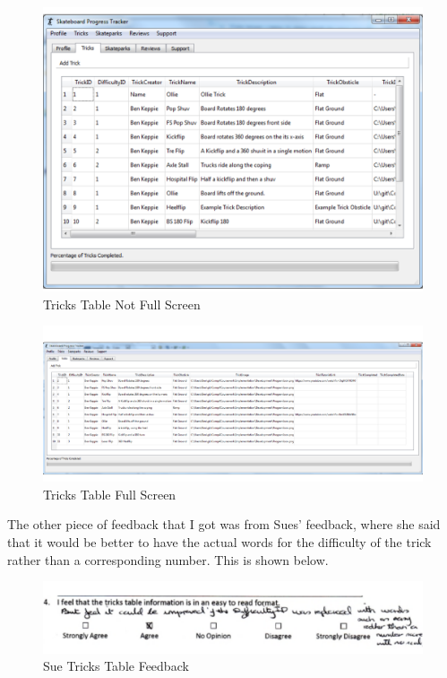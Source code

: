 \begin{figure}[H]
    \includegraphics[width=\textwidth]{./Evaluation/images/TricksTableNFS.pdf}
    \caption{Tricks Table Not Full Screen} \label{fig:TricksTableNFS}
\end{figure}

\begin{figure}[H]
    \includegraphics[width=\textwidth]{./Evaluation/images/TricksTableFS.pdf}
    \caption{Tricks Table Full Screen} \label{fig:TricksTableFS}
\end{figure} 

The other piece of feedback that I got was from Sues' feedback, where she said that it would be better to have the actual words for the difficulty of the trick rather than a corresponding number. This is shown below.

\begin{figure}[H]
    \includegraphics[width=\textwidth]{./Evaluation/images/SueTricks.pdf}
    \caption{Sue Tricks Table Feedback} \label{fig:SueTricksFeedback}
\end{figure}




